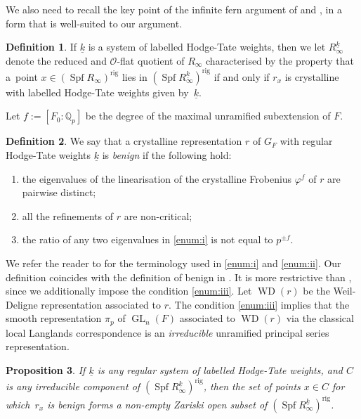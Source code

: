 \documentclass[JEP,XML,SOM,Unicode,NoEqCountersInSection]{cedram}
\let\mathcal\mathscr
\newenvironment{enumeratei}
{\bgroup\def\theenumi{\roman{enumi}}\def\theenumii{\arabic{enumii}}\begin{enumerate}}
{\end{enumerate}\egroup}
\newtheorem{prop}{Proposition}[section]
\theoremstyle{definition}
\newtheorem{defi}[prop]{Definition}
\DeclareMathOperator{\Spf}{Spf}
\DeclareMathOperator{\GL}{GL}
\DeclareMathOperator{\WD}{WD}
\newcommand{\Qp}{\mathbb {Q}_p}
\newcommand{\cO}{\mathcal{O}}
\newcommand\rig{\mathrm{rig}}
\begin{document}
We also need to recall the key point of the infinite fern argument
of \cite{Chenevier} and \cite{Nakamura}, in a form that
is well-suited to our argument.

\begin{defi} If $\underline{k}$ is a system of
labelled Hodge-Tate weights,
then we let $R^{\underline{k}}_{\infty}$ denote the reduced and $\cO$-flat
quotient of $R_{\infty}$ characterised by the property that a~point $x \in (\Spf R_{\infty})^{\rig}$ lies in
$(\Spf R^{\underline{k}}_{\infty})^{\rig}$ if and only if
$r_x$ is crystalline with labelled Hodge-Tate weights given
by~$\underline{k}$.
\end{defi}

Let $f:=[F_0: \Qp]$ be the degree of the maximal unramified subextension of $F$.
\begin{defi}\label{defi:benign}
We say that a crystalline representation $r$ of $G_F$ with regular Hodge-Tate weights $\underline{k}$
is \textit{benign} if the following hold:
\begin{enumeratei}
\item\label{enum:i}
the eigenvalues of the linearisation of the crystalline Frobenius $\varphi^f$ of $r$ are pairwise distinct;
\item\label{enum:ii}
all the refinements of $r$ are non-critical;
\item\label{enum:iii}
the ratio of any two eigenvalues in \eqref{enum:i} is not equal to $p^{\pm f}$.
\end{enumeratei}
\end{defi}
We refer the reader to \cite[\S 2.3]{BHS} for the terminology used in \eqref{enum:i} and \eqref{enum:ii}. Our definition coincides
with the definition of benign in \cite[Def.\,2.8]{Nakamura}. It is more restrictive than \hbox{\cite[Def.\,2.8]{BHS}},
since we additionally impose the condition \eqref{enum:iii}. Let $\WD(r)$ be the Weil-Deligne representation associated to $r$. The
condition \eqref{enum:iii} implies that the smooth representation $\pi_p$ of $\GL_n(F)$ associated to $\WD(r)$ via the classical local
Langlands correspondence is an \textit{irreducible} unramified principal series representation.

\begin{prop}
\label{prop:benign}
If $\underline{k}$ is any regular system of labelled Hodge-Tate weights,
and $C$ is any irreducible component of
$(\Spf R_{\infty}^{\underline{k}})^{\rig}$,
then the set of points $x \in C$ for which~$r_x$ is benign
forms a non-empty Zariski open subset
of $(\Spf R_{\infty}^{\underline{k}})^{\rig}$.
\end{prop}
\end{document}
